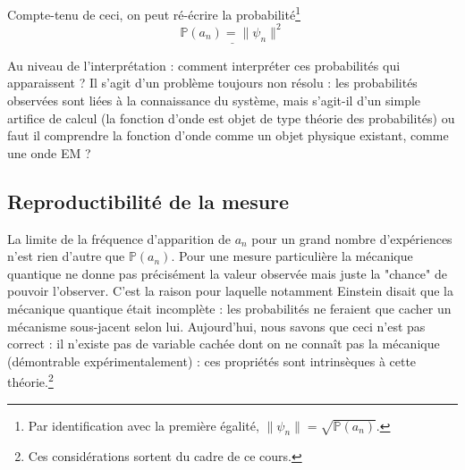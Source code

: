  
 Compte-tenu de ceci, on peut ré-écrire la probabilité\footnote{Par identification avec 
 la première égalité, $\|\psi_n\| = \sqrt{\mathbb{P}(a_n)}$.}
 \begin{equation}
 \underline{\mathbb{P}(a_n) = \|\psi_n\|^2}
 \end{equation}
 
 Au niveau de l'interprétation : comment interpréter ces probabilités 
 qui apparaissent ? Il s'agit d'un problème toujours non résolu : les probabilités 
 observées sont liées à la connaissance du système, mais s'agit-il d'un simple artifice
 de calcul (la fonction d'onde est objet de type  théorie des probabilités)
  ou faut il comprendre la fonction d'onde comme un objet 
 physique existant, comme une onde EM ? \\
 
 \subsection{Reproductibilité de la mesure}
  
 La limite de la fréquence d'apparition de $a_n$ pour un grand nombre d'expériences
 n'est rien d'autre que $\mathbb{P}(a_n)$. Pour une mesure particulière la mécanique quantique ne 
 donne pas précisément  la valeur observée mais juste la "chance" de pouvoir 
 l'observer. C'est la raison pour laquelle notamment Einstein disait que la 
 mécanique quantique était incomplète : les probabilités ne feraient que 
 cacher un mécanisme sous-jacent selon lui. Aujourd'hui, nous savons que ceci n'est pas 
 correct : il n'existe pas de variable cachée dont on ne connaît pas la 
 mécanique (démontrable expérimentalement) : ces propriétés sont intrinsèques 
 à cette théorie.\footnote{Ces considérations sortent du cadre de ce cours.}\\
 

